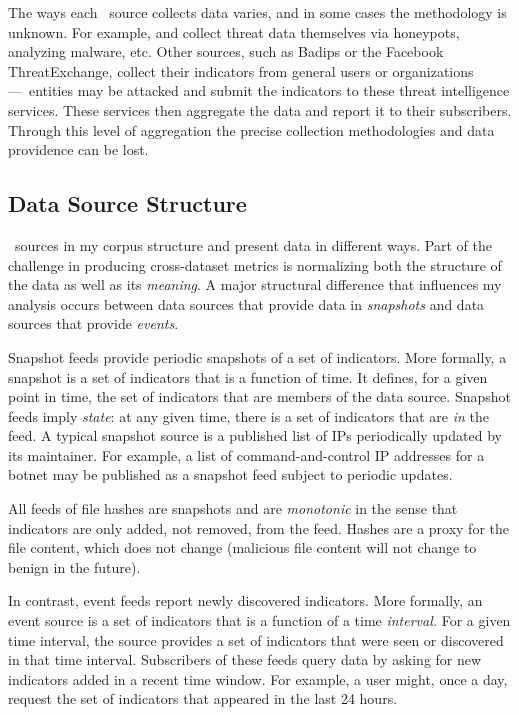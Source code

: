 The ways each \ti\ source collects data varies, and in some cases
the methodology is unknown. For example, {\feedpacketmail} and {\feedetiprep}
collect threat data themselves via honeypots, analyzing malware, etc. Other
sources, such as {Badips} or the Facebook ThreatExchange, collect their
indicators from general users or organizations---\eg\ entities may be attacked
and submit the indicators to these threat intelligence services. These services
then aggregate the data and report it to their subscribers. Through this level of
aggregation the precise collection methodologies and data
providence can be lost.


\subsection{Data Source Structure}
\label{sec:feed-structure}

\ti\ sources in my corpus structure and present data in different ways.
Part of the challenge in producing cross-dataset metrics is normalizing both
the structure of the data as well as its \emph{meaning}. A major structural
difference that influences my analysis occurs between data sources that
provide data in \emph{snapshots} and data sources that provide \emph{events}.

Snapshot feeds provide periodic snapshots of a set of indicators. More formally, a
snapshot is a set of indicators that is a function of time. It defines, for a given point in
time, the set of indicators that are members of the data source. Snapshot feeds imply
\emph{state}: at any given time, there is a set of indicators that are \emph{in} the feed.
A typical snapshot source is a published list of IPs periodically updated by its maintainer.
For example, a list of command-and-control IP addresses for a botnet may be published as a
snapshot feed subject to periodic updates.

All feeds of file hashes are snapshots and are \emph{monotonic} in the sense that indicators
are only added, not removed, from the feed. Hashes are a proxy for the file
content, which does not change (malicious file content will not change to benign in the future).

In contrast, event feeds report newly discovered indicators. More formally, an event source
is a set of indicators that is a function of a time \emph{interval.} For a given time interval,
the source provides a set of indicators that were seen or discovered in that time interval.
Subscribers of these feeds query data by asking for new indicators added in a recent time window.
For example, a user might, once a day, request the set of indicators that appeared
in the last 24 hours.

